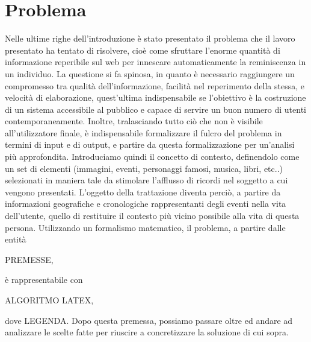 \documentclass[sigproc-sp.tex]{subfiles}
\begin{document}
\section{Problema}
Nelle ultime righe dell’introduzione è stato presentato il problema che il lavoro presentato ha tentato di risolvere, cioè come sfruttare l’enorme quantità di informazione reperibile sul web per innescare automaticamente la reminiscenza in un individuo. La questione si fa spinosa, in quanto è necessario raggiungere un compromesso tra qualità dell’informazione, facilità nel reperimento della stessa, e velocità di elaborazione, quest’ultima indispensabile se l’obiettivo è la costruzione di un sistema accessibile al pubblico e capace di servire un buon numero di utenti contemporaneamente. Inoltre, tralasciando tutto ciò che non è visibile all’utilizzatore finale, è indispensabile formalizzare il fulcro del problema in termini di input e di output, e partire da questa formalizzazione per un’analisi più approfondita.
Introduciamo quindi il concetto di contesto, definendolo come un set di elementi (immagini, eventi, personaggi famosi, musica, libri, etc..) selezionati in maniera tale da stimolare l’afflusso di ricordi nel soggetto a cui vengono presentati. L’oggetto della trattazione diventa perciò, a partire da informazioni geografiche e cronologiche rappresentanti degli eventi nella vita dell’utente, quello di restituire il contesto più vicino possibile alla vita di questa persona.
Utilizzando un formalismo matematico, il problema, a partire dalle entità 

PREMESSE,

è rappresentabile con

ALGORITMO LATEX, 

dove LEGENDA.
Dopo questa premessa, possiamo passare oltre ed andare ad analizzare le scelte fatte per riuscire a concretizzare la soluzione di cui sopra.
\end{document}
